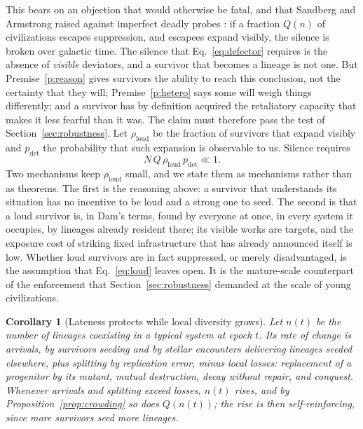 \documentclass[preprint,12pt]{elsarticle}
\newtheorem{corollary}{Corollary}
\theoremstyle{definition}
\begin{document}
This bears on an objection that would otherwise be fatal, and that Sandberg and Armstrong raised against imperfect deadly probes \citep{SandbergArmstrong2013}: if a fraction $Q(n)$ of civilizations escapes suppression, and escapees expand visibly, the silence is broken over galactic time. The silence that Eq.~\eqref{eq:defector} requires is the absence of \emph{visible} deviators, and a survivor that becomes a lineage is not one. But Premise~\ref{p:reason} gives survivors the ability to reach this conclusion, not the certainty that they will; Premise~\ref{p:hetero} says some will weigh things differently; and a survivor has by definition acquired the retaliatory capacity that makes it less fearful than it was. The claim must therefore pass the test of Section~\ref{sec:robustness}. Let $\rho_{\text{loud}}$ be the fraction of survivors that expand visibly and $p_{\text{det}}$ the probability that such expansion is observable to us. Silence requires
\begin{equation}
N\,Q\,\rho_{\text{loud}}\,p_{\text{det}} \ll 1 .
\label{eq:loud}
\end{equation}
Two mechanisms keep $\rho_{\text{loud}}$ small, and we state them as mechanisms rather than as theorems. The first is the reasoning above: a survivor that understands its situation has no incentive to be loud and a strong one to seed. The second is that a loud survivor is, in Dam's terms, found by everyone at once, in every system it occupies, by lineages already resident there; its visible works are targets, and the exposure cost of striking fixed infrastructure that has already announced itself is low. Whether loud survivors are in fact suppressed, or merely disadvantaged, is the assumption that Eq.~\eqref{eq:loud} leaves open. It is the mature-scale counterpart of the enforcement that Section~\ref{sec:robustness} demanded at the scale of young civilizations.

\begin{corollary}[Lateness protects while local diversity grows]
\label{cor:epoch}
Let $n(t)$ be the number of lineages coexisting in a typical system at epoch $t$. Its rate of change is arrivals, by survivors seeding and by stellar encounters delivering lineages seeded elsewhere, plus splitting by replication error, minus local losses: replacement of a progenitor by its mutant, mutual destruction, decay without repair, and conquest. Whenever arrivals and splitting exceed losses, $n(t)$ rises, and by Proposition~\ref{prop:crowding} so does $Q(n(t))$; the rise is then self-reinforcing, since more survivors seed more lineages.
\end{corollary}
\end{document}
